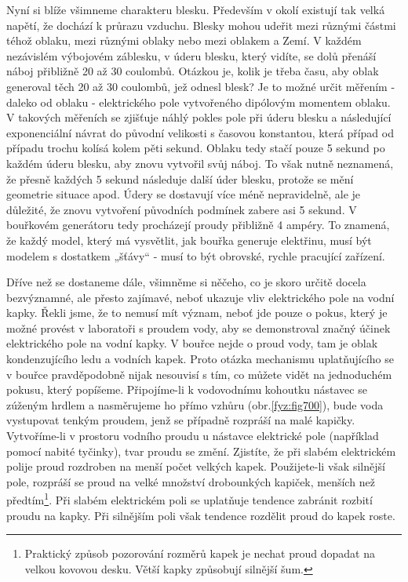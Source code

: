     Nyní si blíže všimneme charakteru blesku. Především v okolí existují tak velká napětí, že
    dochází k průrazu vzduchu. Blesky mohou udeřit mezi různými částmi téhož oblaku, mezi různými
    oblaky nebo mezi oblakem a Zemí. V každém nezávislém výbojovém záblesku, v úderu blesku, který
    vidíte, se dolů přenáší náboj přibližně 20 až 30 coulombů. Otázkou je, kolik je třeba času, aby
    oblak generoval těch 20 až 30 coulombů, jež odnesl blesk? Je to možné určit měřením - daleko od
    oblaku - elektrického pole vytvořeného dipólovým momentem oblaku. V takových měřeních se
    zjišťuje náhlý pokles pole při úderu blesku a následující exponenciální návrat do původní
    velikosti s časovou konstantou, která případ od případu trochu kolísá kolem pěti sekund. Oblaku
    tedy stačí pouze 5 sekund po každém úderu blesku, aby znovu vytvořil svůj náboj. To však nutně
    neznamená, že přesně každých 5 sekund následuje další úder blesku, protože se mění geometrie
    situace apod. Údery se dostavují více méně nepravidelně, ale je důležité, že znovu vytvoření
    původních podmínek zabere asi 5 sekund. V bouřkovém generátoru tedy procházejí proudy přibližně
    4 ampéry. To znamená, že každý model, který má vysvětlit, jak bouřka generuje elektřinu, musí
    být modelem s dostatkem „šťávy“ - musí to být obrovské, rychle pracující zařízení.

    Dříve než se dostaneme dále, všimněme si něčeho, co je skoro určitě docela bezvýznamné, ale
    přesto zajímavé, neboť ukazuje vliv elektrického pole na vodní kapky. Řekli jsme, že to nemusí
    mít význam, neboť jde pouze o pokus, který je možné provést v laboratoři s proudem vody, aby se
    demonstroval značný účinek elektrického pole na vodní kapky. V bouřce nejde o proud vody, tam je
    oblak kondenzujícího ledu a vodních kapek. Proto otázka mechanismu uplatňujícího se v bouřce
    pravděpodobně nijak nesouvisí s tím, co můžete vidět na jednoduchém pokusu, který popíšeme.
    Připojíme-li k vodovodnímu kohoutku nástavec se zúženým hrdlem a nasměrujeme ho přímo vzhůru
    (obr.\ref{fyz:fig700}), bude voda vystupovat tenkým proudem, jenž se případně rozpráší na malé
    kapičky. Vytvoříme-li v prostoru vodního proudu u nástavce elektrické pole (například pomocí
    nabité tyčinky), tvar proudu se změní. Zjistíte, že při slabém elektrickém polije proud
    rozdroben na menší počet velkých kapek. Použijete-li však silnější pole, rozpráší se proud na
    velké množství drobounkých kapiček, menších než předtím\footnote{Praktický způsob pozorování
    rozměrů kapek je nechat proud dopadat na velkou kovovou desku. Větší kapky způsobují silnější
    šum.}. Při slabém elektrickém poli se uplatňuje tendence zabránit rozbití proudu na kapky. Při
    silnějším poli však tendence rozdělit proud do kapek roste.

